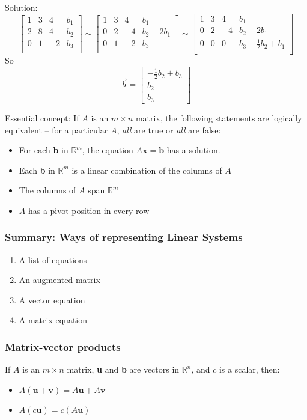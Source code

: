 \documentclass[12pt]{article} %
\newcommand{\R}{\mathbb{R}}
\begin{document}
Solution: 
$$\begin{bmatrix}
	1 & 3 & 4 & b_1\\
	2 & 8 & 4 & b_2\\
	0 & 1& -2 & b_3\\
\end{bmatrix} \sim 
\begin{bmatrix}
	1 & 3 & 4 & b_1\\
	0 & 2 & -4 & b_2 - 2b_1\\
	0 & 1& -2 & b_3\\
\end{bmatrix} \sim 
\begin{bmatrix}
	1 & 3 & 4 & b_1\\
	0 & 2 & -4 & b_2 - 2b_1\\
	0 & 0 & 0 & b_3 - \frac{1}{2}b_2 + b_1\\
\end{bmatrix}$$
So $$ \vec{b} = \begin{bmatrix} -\frac{1}{2}b_2 + b_3\\ b_2 \\ b_3\end{bmatrix}$$

Essential concept:
If $A$ is an $m\times n$ matrix, the following statements are logically equivalent -- for a particular $A$, \emph{all} are true or \emph{all} are false:
\begin{itemize}
	\item For each \textbf{b} in $\R^m$, the equation $A\mathbf{x} = \mathbf{b}$ has a solution.
	\item Each \textbf{b} in $\R^m$ is a linear combination of the columns of $A$
	\item The columns of $A$ span $\R^m$
	\item $A$ has a pivot position in every row
\end{itemize}

\subsubsection{Summary: Ways of representing Linear Systems}
\begin{enumerate}
	\item A list of equations
	\item An augmented matrix
	\item A vector equation
	\item A matrix equation
\end{enumerate}

\subsubsection{Matrix-vector products}
If $A$ is an $m\times n$ matrix, \textbf{u} and \textbf{b} are vectors in $\R^n$, and $c$ is a scalar, then:
\begin{itemize}
	\item $A(\mathbf{u} + \mathbf{v}) = A\mathbf{u} + A\mathbf{v}$
	\item $A(c\mathbf{u}) = c(A\mathbf{u})$
\end{itemize}
\end{document}
